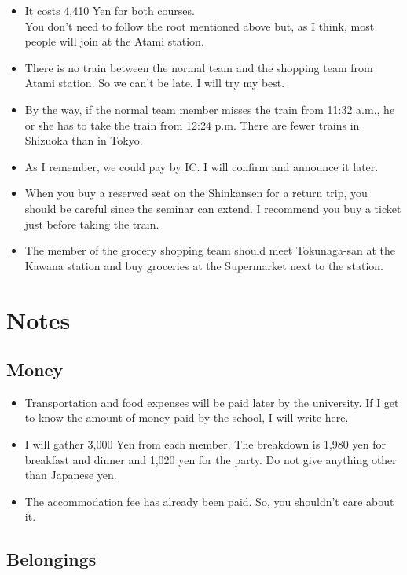 \documentclass[unicode,a4paper,11pt]{ltjsarticle}
\begin{document}
\begin{itemize}
  \item
        It costs 4,410 Yen for both courses. \\
        You don't need to follow the root mentioned above but, as I think, most people will join at the Atami station. 
  \item
        There is no train between the normal team and the shopping team from Atami station. So we can't be late. I will try my best.
  \item
        By the way, if the normal team member misses the train from 11:32 a.m., he or she has to take the train from 12:24 p.m. There are fewer trains in Shizuoka than in Tokyo.
  \item
        As I remember, we could pay by IC. I will confirm and announce it later.
  \item
        When you buy a reserved seat on the Shinkansen for a return trip, you should be careful since the seminar can extend. I recommend you buy a ticket just before taking the train.
  \item
        The member of the grocery shopping team should meet Tokunaga-san at the Kawana station and buy groceries at the Supermarket next to the station.
\end{itemize}


\section{Notes}


\subsection*{Money}

\begin{itemize}
  \item
        Transportation and food expenses will be paid later by the university. If I get to know the amount of money paid by the school, I will write here.
  \item
        I will gather 3,000 Yen from each member. The breakdown is 1,980 yen for breakfast and dinner and 1,020 yen for the party. Do not give anything other than Japanese yen.
  \item
        The accommodation fee has already been paid. So, you shouldn't care about it.
\end{itemize}


\subsection*{Belongings}
\end{document}
